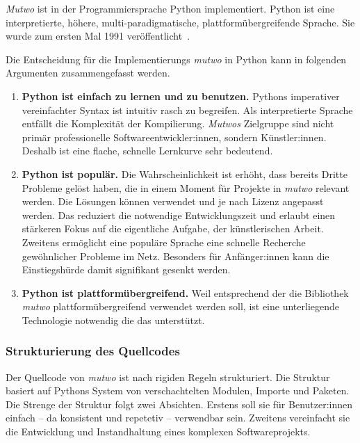 \documentclass[12pt,a4paper,ngerman]{article}
\begin{document}
\emph{Mutwo} ist in der Programmiersprache Python implementiert.
Python ist eine interpretierte, höhere, multi-paradigmatische, plattformübergreifende Sprache.
Sie wurde zum ersten Mal 1991 veröffentlicht~\parencite{generalPythonFAQ}.

\smallskip

Die Entscheidung für die Implementierungs \emph{mutwo} in Python kann in folgenden Argumenten zusammengefasst werden.


\begin{enumerate}
    \item{
            \textbf{Python ist einfach zu lernen und zu benutzen.}
            Pythons imperativer vereinfachter Syntax ist intuitiv rasch zu begreifen.
            Als interpretierte Sprache entfällt die Komplexität der Kompilierung.
            \emph{Mutwos} Zielgruppe sind nicht primär  professionelle Softwareentwickler:innen, sondern Künstler:innen.
            Deshalb ist eine flache, schnelle Lernkurve sehr bedeutend.
    }
    \item{
            \textbf{Python ist populär.}
            Die Wahrscheinlichkeit ist erhöht, dass bereits Dritte Probleme gelöst haben, die in einem Moment für Projekte in \emph{mutwo} relevant werden.
            Die Lösungen können verwendet und je nach Lizenz angepasst werden.
            Das reduziert die notwendige Entwicklungszeit und erlaubt einen stärkeren Fokus auf die eigentliche Aufgabe, der künstlerischen Arbeit.
            Zweitens ermöglicht eine populäre Sprache eine schnelle Recherche gewöhnlicher Probleme im Netz.
            Besonders für Anfänger:innen kann die Einstiegshürde damit signifikant gesenkt werden.
    }
    \item{
            \textbf{Python ist plattformübergreifend.}
            Weil entsprechend der \emph{} die Bibliothek \emph{mutwo} plattformübergreifend verwendet werden soll, ist eine unterliegende Technologie notwendig die das unterstützt.
    }
\end{enumerate}


\subsubsection{Strukturierung des Quellcodes}
\label{quellcodeStruktur}

Der Quellcode von \emph{mutwo} ist nach rigiden Regeln strukturiert.
Die Struktur basiert auf Pythons System von verschachtelten Modulen, Importe und Paketen.
Die Strenge der Struktur folgt zwei Absichten.
Erstens soll sie für Benutzer:innen einfach -- da konsistent und repetetiv -- verwendbar sein.
Zweitens vereinfacht sie die Entwicklung und Instandhaltung eines komplexen Softwareprojekts.
\end{document}
